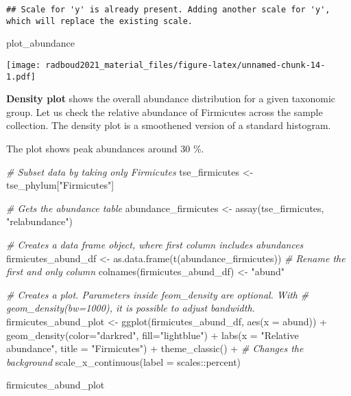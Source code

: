 \documentclass[
]{book}
\newenvironment{Shaded}{\begin{snugshade}}{\end{snugshade}}
\newcommand{\AttributeTok}[1]{\textcolor[rgb]{0.77,0.63,0.00}{#1}}
\newcommand{\CommentTok}[1]{\textcolor[rgb]{0.56,0.35,0.01}{\textit{#1}}}
\newcommand{\FunctionTok}[1]{\textcolor[rgb]{0.00,0.00,0.00}{#1}}
\newcommand{\NormalTok}[1]{#1}
\newcommand{\OtherTok}[1]{\textcolor[rgb]{0.56,0.35,0.01}{#1}}
\newcommand{\SpecialCharTok}[1]{\textcolor[rgb]{0.00,0.00,0.00}{#1}}
\newcommand{\StringTok}[1]{\textcolor[rgb]{0.31,0.60,0.02}{#1}}
\begin{document}
\begin{verbatim}
## Scale for 'y' is already present. Adding another scale for 'y', which will replace the existing scale.
\end{verbatim}

\begin{Shaded}
\begin{Highlighting}[]
\NormalTok{plot\_abundance }
\end{Highlighting}
\end{Shaded}

\texttt{[image: radboud2021\_material\_files/figure-latex/unnamed-chunk-14-1.pdf]}

\textbf{Density plot} shows the overall abundance distribution for a given
taxonomic group. Let us check the relative abundance of Firmicutes
across the sample collection. The density plot is a smoothened
version of a standard histogram.

The plot shows peak abundances around 30 \%.

\begin{Shaded}
\begin{Highlighting}[]
\CommentTok{\# Subset data by taking only Firmicutes}
\NormalTok{tse\_firmicutes }\OtherTok{\textless{}{-}}\NormalTok{ tse\_phylum[}\StringTok{"Firmicutes"}\NormalTok{]}

\CommentTok{\# Gets the abundance table}
\NormalTok{abundance\_firmicutes }\OtherTok{\textless{}{-}} \FunctionTok{assay}\NormalTok{(tse\_firmicutes, }\StringTok{"relabundance"}\NormalTok{)}

\CommentTok{\# Creates a data frame object, where first column includes abundances}
\NormalTok{firmicutes\_abund\_df }\OtherTok{\textless{}{-}} \FunctionTok{as.data.frame}\NormalTok{(}\FunctionTok{t}\NormalTok{(abundance\_firmicutes))}
\CommentTok{\# Rename the first and only column}
\FunctionTok{colnames}\NormalTok{(firmicutes\_abund\_df) }\OtherTok{\textless{}{-}} \StringTok{"abund"}

\CommentTok{\# Creates a plot. Parameters inside feom\_density are optional. With }
\CommentTok{\# geom\_density(bw=1000), it is possible to adjust bandwidth.}
\NormalTok{firmicutes\_abund\_plot }\OtherTok{\textless{}{-}} \FunctionTok{ggplot}\NormalTok{(firmicutes\_abund\_df, }\FunctionTok{aes}\NormalTok{(}\AttributeTok{x =}\NormalTok{ abund)) }\SpecialCharTok{+} 
  \FunctionTok{geom\_density}\NormalTok{(}\AttributeTok{color=}\StringTok{"darkred"}\NormalTok{, }\AttributeTok{fill=}\StringTok{"lightblue"}\NormalTok{) }\SpecialCharTok{+} 
  \FunctionTok{labs}\NormalTok{(}\AttributeTok{x =} \StringTok{"Relative abundance"}\NormalTok{, }\AttributeTok{title =} \StringTok{"Firmicutes"}\NormalTok{) }\SpecialCharTok{+}
  \FunctionTok{theme\_classic}\NormalTok{() }\SpecialCharTok{+} \CommentTok{\# Changes the background}
  \FunctionTok{scale\_x\_continuous}\NormalTok{(}\AttributeTok{label =}\NormalTok{ scales}\SpecialCharTok{::}\NormalTok{percent)}

\NormalTok{firmicutes\_abund\_plot}
\end{Highlighting}
\end{Shaded}
\end{document}
